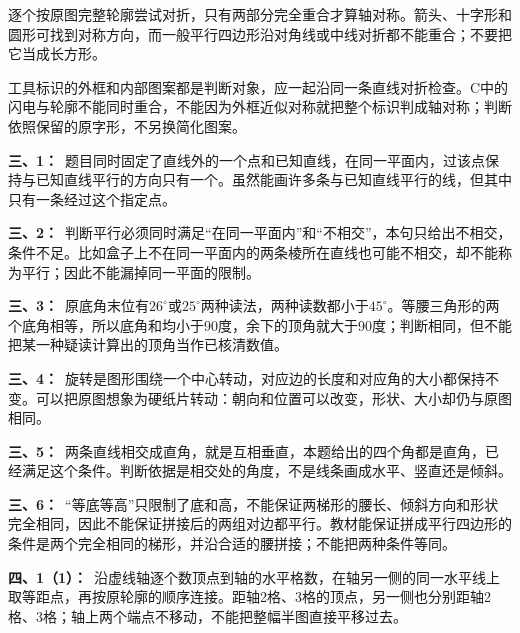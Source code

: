 \documentclass[multi=snippet,border=0pt]{standalone}
\newenvironment{snippet}[3]{\begin{minipage}{#1bp}\color{answerred}\fontsize{#2}{#3}\selectfont\raggedright}{\end{minipage}}
\begin{document}
\begin{snippet}{505}{11.5}{14}逐个按原图完整轮廓尝试对折，只有两部分完全重合才算轴对称。箭头、十字形和圆形可找到对称方向，而一般平行四边形沿对角线或中线对折都不能重合；不要把它当成长方形。\end{snippet}
\begin{snippet}{505}{11.5}{14}工具标识的外框和内部图案都是判断对象，应一起沿同一条直线对折检查。C中的闪电与轮廓不能同时重合，不能因为外框近似对称就把整个标识判成轴对称；判断依照保留的原字形，不另换简化图案。\end{snippet}
\begin{snippet}{505}{11.5}{14}\textbf{三、1：}\ 题目同时固定了直线外的一个点和已知直线，在同一平面内，过该点保持与已知直线平行的方向只有一个。虽然能画许多条与已知直线平行的线，但其中只有一条经过这个指定点。\end{snippet}
\begin{snippet}{505}{11.5}{14}\textbf{三、2：}\ 判断平行必须同时满足“在同一平面内”和“不相交”，本句只给出不相交，条件不足。比如盒子上不在同一平面内的两条棱所在直线也可能不相交，却不能称为平行；因此不能漏掉同一平面的限制。\end{snippet}
\begin{snippet}{505}{11.5}{14}\textbf{三、3：}\ 原底角末位有\(26^\circ\)或\(25^\circ\)两种读法，两种读数都小于\(45^\circ\)。等腰三角形的两个底角相等，所以底角和均小于90度，余下的顶角就大于90度；判断相同，但不能把某一种疑读计算出的顶角当作已核清数值。\end{snippet}
\begin{snippet}{505}{11.5}{14}\textbf{三、4：}\ 旋转是图形围绕一个中心转动，对应边的长度和对应角的大小都保持不变。可以把原图想象为硬纸片转动：朝向和位置可以改变，形状、大小却仍与原图相同。\end{snippet}
\begin{snippet}{505}{11.5}{14}\textbf{三、5：}\ 两条直线相交成直角，就是互相垂直，本题给出的四个角都是直角，已经满足这个条件。判断依据是相交处的角度，不是线条画成水平、竖直还是倾斜。\end{snippet}
\begin{snippet}{505}{11.5}{14}\textbf{三、6：}\ “等底等高”只限制了底和高，不能保证两梯形的腰长、倾斜方向和形状完全相同，因此不能保证拼接后的两组对边都平行。教材能保证拼成平行四边形的条件是两个完全相同的梯形，并沿合适的腰拼接；不能把两种条件等同。\end{snippet}
\begin{snippet}{505}{11.5}{14}\textbf{四、1（1）：}\ 沿虚线轴逐个数顶点到轴的水平格数，在轴另一侧的同一水平线上取等距点，再按原轮廓的顺序连接。距轴2格、3格的顶点，另一侧也分别距轴2格、3格；轴上两个端点不移动，不能把整幅半图直接平移过去。\end{snippet}
\end{document}
